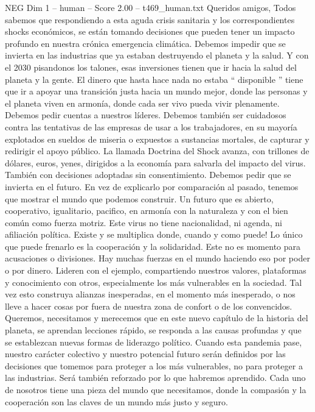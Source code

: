 \begin{textsample}{NEG Dim 1 – human – Score 2.00 – t469\_human.txt}  \label{ex:f1_neg_043}
Queridos amigos, Todos sabemos que respondiendo a esta aguda crisis sanitaria y los correspondientes shocks económicos, se están tomando decisiones que pueden tener un impacto profundo en nuestra crónica emergencia climática.
Debemos impedir que se invierta en las industrias que ya estaban destruyendo el planeta y la salud.
Y con el 2030 pisandonos los talones, esas inversiones tienen que ir hacia la salud del planeta y la gente.
El dinero que hasta hace nada no estaba “ disponible ” tiene que ir a apoyar una transición justa hacia un mundo mejor, donde las personas y el planeta viven en armonía, donde cada ser vivo pueda vivir plenamente.
Debemos pedir cuentas a nuestros líderes.
Debemos también ser cuidadosos contra las tentativas de las empresas de usar a los trabajadores, en su mayoría explotados en sueldos de miseria o expuestos a sustancias mortales, de capturar y redirigir el apoyo público.
La llamada Doctrina del Shock avanza, con trillones de dólares, euros, yenes, dirigidos a la economía para salvarla del impacto del virus.
También con decisiones adoptadas sin consentimiento.
Debemos pedir que se invierta en el futuro.
En vez de explicarlo por comparación al pasado, tenemos que mostrar el mundo que podemos construir.
Un futuro que es abierto, cooperativo, igualitario, pacifico, en armonía con la naturaleza y con el bien común como fuerza motriz.
Este virus no tiene nacionalidad, ni agenda, ni afiliación política.
Existe y se multiplica donde, cuando y como puede!
Lo único que puede frenarlo es la cooperación y la solidaridad.
Este no es momento para acusaciones o divisiones.
Hay muchas fuerzas en el mundo haciendo eso por poder o por dinero.
Lideren con el ejemplo, compartiendo nuestros valores, plataformas y conocimiento con otros, especialmente los más vulnerables en la sociedad.
Tal vez esto construya alianzas inesperadas, en el momento más inesperado, o nos lleve a hacer cosas por fuera de nuestra zona de confort o de los convencidos.
Queremos, necesitamos y merecemos que en este nuevo capítulo de la historia del planeta, se aprendan lecciones rápido, se responda a las causas profundas y que se establezcan nuevas formas de liderazgo político.
Cuando esta pandemia pase, nuestro carácter colectivo y nuestro potencial futuro serán definidos por las decisiones que tomemos para proteger a los más vulnerables, no para proteger a las industrias.
Será también reforzado por lo que habremos aprendido.
Cada uno de nosotros tiene una pieza del mundo que necesitamos, donde la compasión y la cooperación son las claves de un mundo más justo y seguro.

\end{textsample}
